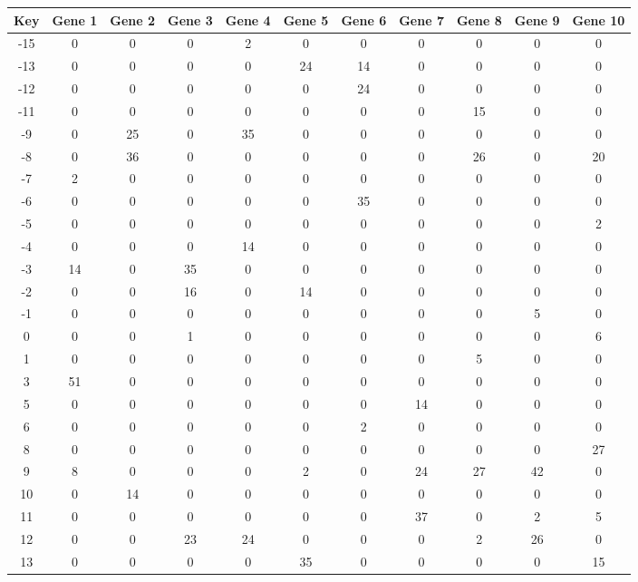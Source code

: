 \begin{tabular}{|c|c|c|c|c|c|c|c|c|c|c|}
\hline
Key & Gene 1 & Gene 2 & Gene 3 & Gene 4 & Gene 5 & Gene 6 & Gene 7 & Gene 8 & Gene 9 & Gene 10 \\
\hline
-15 & 0 & 0 & 0 & 2 & 0 & 0 & 0 & 0 & 0 & 0 \\
-13 & 0 & 0 & 0 & 0 & 24 & 14 & 0 & 0 & 0 & 0 \\
-12 & 0 & 0 & 0 & 0 & 0 & 24 & 0 & 0 & 0 & 0 \\
-11 & 0 & 0 & 0 & 0 & 0 & 0 & 0 & 15 & 0 & 0 \\
-9 & 0 & 25 & 0 & 35 & 0 & 0 & 0 & 0 & 0 & 0 \\
-8 & 0 & 36 & 0 & 0 & 0 & 0 & 0 & 26 & 0 & 20 \\
-7 & 2 & 0 & 0 & 0 & 0 & 0 & 0 & 0 & 0 & 0 \\
-6 & 0 & 0 & 0 & 0 & 0 & 35 & 0 & 0 & 0 & 0 \\
-5 & 0 & 0 & 0 & 0 & 0 & 0 & 0 & 0 & 0 & 2 \\
-4 & 0 & 0 & 0 & 14 & 0 & 0 & 0 & 0 & 0 & 0 \\
-3 & 14 & 0 & 35 & 0 & 0 & 0 & 0 & 0 & 0 & 0 \\
-2 & 0 & 0 & 16 & 0 & 14 & 0 & 0 & 0 & 0 & 0 \\
-1 & 0 & 0 & 0 & 0 & 0 & 0 & 0 & 0 & 5 & 0 \\
0 & 0 & 0 & 1 & 0 & 0 & 0 & 0 & 0 & 0 & 6 \\
1 & 0 & 0 & 0 & 0 & 0 & 0 & 0 & 5 & 0 & 0 \\
3 & 51 & 0 & 0 & 0 & 0 & 0 & 0 & 0 & 0 & 0 \\
5 & 0 & 0 & 0 & 0 & 0 & 0 & 14 & 0 & 0 & 0 \\
6 & 0 & 0 & 0 & 0 & 0 & 2 & 0 & 0 & 0 & 0 \\
8 & 0 & 0 & 0 & 0 & 0 & 0 & 0 & 0 & 0 & 27 \\
9 & 8 & 0 & 0 & 0 & 2 & 0 & 24 & 27 & 42 & 0 \\
10 & 0 & 14 & 0 & 0 & 0 & 0 & 0 & 0 & 0 & 0 \\
11 & 0 & 0 & 0 & 0 & 0 & 0 & 37 & 0 & 2 & 5 \\
12 & 0 & 0 & 23 & 24 & 0 & 0 & 0 & 2 & 26 & 0 \\
13 & 0 & 0 & 0 & 0 & 35 & 0 & 0 & 0 & 0 & 15 \\
\hline
\end{tabular}